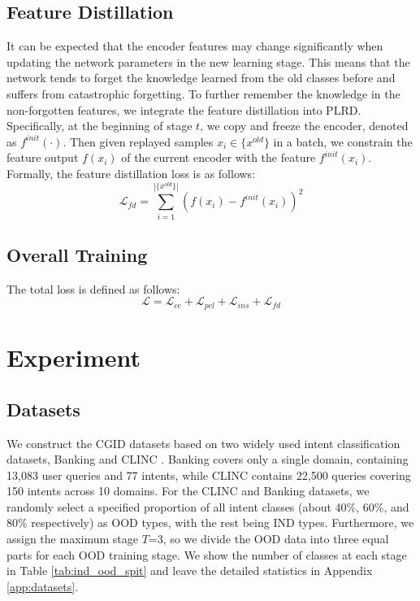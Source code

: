 \documentclass[11pt]{article}
\begin{document}
\subsection{Feature Distillation}
It can be expected that the encoder features may change significantly when updating the network parameters in the new learning stage. This means that the network tends to forget the knowledge learned from the old classes before and suffers from catastrophic forgetting. To further remember the knowledge in the non-forgotten features, we integrate the feature distillation into PLRD. Specifically, at the beginning of stage $t$, we copy and freeze the encoder, denoted as $f^{init}(\cdot)$. Then given replayed samples $x_i\in\{x^{old}\}$ in a batch, we constrain the feature output $f(x_i)$ of the current encoder with the feature $f^{init}(x_i)$. Formally, the feature distillation loss is as follows:
\begin{equation}
    \mathcal{L}_{fd}=\sum^{|\{x^{old}\}|}_{i=1}(f(x_i)-f^{init}(x_i))^2
\end{equation}
\subsection{Overall Training}
The total loss is defined as follows:
\begin{equation}
    \mathcal{L}=\mathcal{L}_{ce}+\mathcal{L}_{pcl}+\mathcal{L}_{ins}+\mathcal{L}_{fd}
\end{equation}

\section{Experiment}
\label{sec:experiment}

\subsection{Datasets}
We construct the CGID datasets based on two widely used intent classification datasets, Banking \cite{casanueva-etal-2020-efficient} and CLINC \cite{larson-etal-2019-evaluation}. Banking covers only a single domain, containing 13,083 user queries and 77 intents, while CLINC contains 22,500 queries covering 150 intents across 10 domains. For the CLINC and Banking datasets, we randomly select a specified proportion of all intent classes (about 40\%, 60\%, and 80\% respectively) as OOD types, with the rest being IND types. Furthermore, we assign the maximum stage $T$=3, so we divide the OOD data into three equal parts for each OOD training stage. We show the number of classes at each stage in Table \ref{tab:ind_ood_spit} and leave the detailed statistics in Appendix \ref{app:datasets}.
\end{document}
